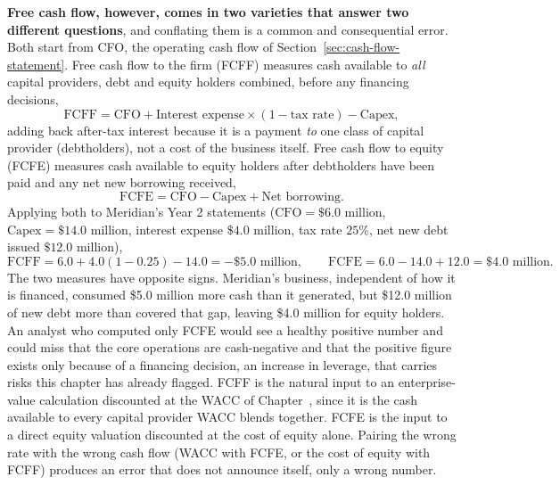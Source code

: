 \documentclass[../ai_in_finance]{subfiles}
\begin{document}
\textbf{Free cash flow, however, comes in two varieties that answer two different questions}, and conflating them is a common and consequential error. Both start from CFO, the operating cash flow of Section~\ref{sec:cash-flow-statement}. Free cash flow to the firm (FCFF) measures cash available to \emph{all} capital providers, debt and equity holders combined, before any financing decisions,
\begin{equation}
\text{FCFF} = \text{CFO} + \text{Interest expense} \times (1 - \text{tax rate}) - \text{Capex},\label{eq:statements-fcff}
\end{equation}
adding back after-tax interest because it is a payment \emph{to} one class of capital provider (debtholders), not a cost of the business itself. Free cash flow to equity (FCFE) measures cash available to equity holders after debtholders have been paid and any net new borrowing received,
\begin{equation}
\text{FCFE} = \text{CFO} - \text{Capex} + \text{Net borrowing}.\label{eq:statements-fcfe}
\end{equation}
Applying both to Meridian's Year 2 statements ($\text{CFO}=\$6.0$ million, $\text{Capex}=\$14.0$ million, interest expense $\$4.0$ million, tax rate $25\%$, net new debt issued $\$12.0$ million),
\begin{equation*}
\text{FCFF} = 6.0 + 4.0(1-0.25) - 14.0 = -\$5.0 \text{ million}, \qquad \text{FCFE} = 6.0 - 14.0 + 12.0 = \$4.0 \text{ million}.
\end{equation*}
The two measures have opposite signs. Meridian's business, independent of how it is financed, consumed \$5.0 million more cash than it generated, but \$12.0 million of new debt more than covered that gap, leaving \$4.0 million for equity holders. An analyst who computed only FCFE would see a healthy positive number and could miss that the core operations are cash-negative and that the positive figure exists only because of a financing decision, an increase in leverage, that carries risks this chapter has already flagged.
FCFF is the natural input to an enterprise-value calculation discounted at the WACC of Chapter~, since it is the cash available to every capital provider WACC blends together. FCFE is the input to a direct equity valuation discounted at the cost of equity alone. Pairing the wrong rate with the wrong cash flow (WACC with FCFE, or the cost of equity with FCFF) produces an error that does not announce itself, only a wrong number.
\end{document}
